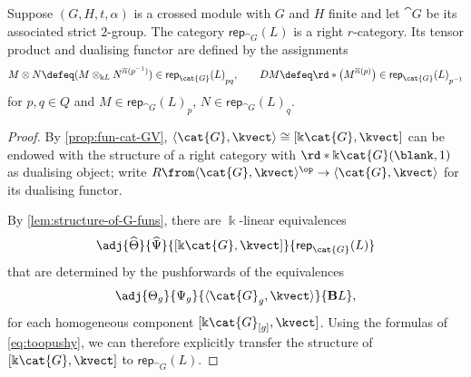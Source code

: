 \begin{proposition}\label{prop:2-groups-tensor-product}
  Suppose \((G,H,t,\alpha)\) is a crossed module with \(G\) and \(H\) finite and let \(\cat{G}\) be its associated strict \(2\)\hyp{}group.
  The category \(\mathsf{rep}_{\cat{G}}(L)\) is a right \(r\)\hyp{}category.
  Its tensor product and dualising functor are defined by the assignments
  \[
    M\otimes N \defeq (M\otimes_{\Bbbk L} N^{\overline{\alpha}(p^{-1})})\in {\mathsf{rep}_{\cat{G}}(L)}_{pq}, \qquad
    D M \defeq \rd*{\big(M^{\overline{\alpha}(p)}\big)} \in {\mathsf{rep}_{\cat{G}}(L)}_{p^{-1}}
  \]
  for \(p, q \in Q\) and \(M \in {\mathsf{rep}_{\cat{G}}(L)}_{p}\), \(N \in {\mathsf{rep}_{\cat{G}}(L)}_{q}\).
\end{proposition}
\begin{proof}
  By \cref{prop:fun-cat-GV},
  \(\langle\cat{G},\kvect\rangle \cong [\Bbbk\cat{G}, \kvect]\) can be endowed with the structure of a right \GV{} category
  with \(\rd*{\Bbbk\cat{G}( \blank , 1)}\) as dualising object;
  write \(R \from \langle\cat{G},\kvect\rangle^{\op} \to \langle\cat{G},\kvect\rangle\) for its dualising functor.

  By \cref{lem:structure-of-G-funs}, there are \(\Bbbk\)\hyp{}linear equivalences
  \[
    \adj{\widehat{\Theta}}{\widehat{\Psi}}{[\Bbbk\cat{G}, \kvect]}{\mathsf{rep}_{\cat{G}}(L)}
  \]
  that are determined
  by the pushforwards of the equivalences
  \[
    \adj{\Theta_g}{\Psi_{g}}{\langle\cat{G}_g, \kvect\rangle}{\mathbf{B}L},
  \]
  for each homogeneous component \([\Bbbk\cat{G}_{[g]}, \kvect]\).
  Using the formulas of \cref{eq:toopushy},
  we can therefore explicitly transfer the \GV{} structure of \([\Bbbk\cat{G}, \kvect]\) to \(\mathsf{rep}_{\cat{G}}(L)\).


\end{proof}
